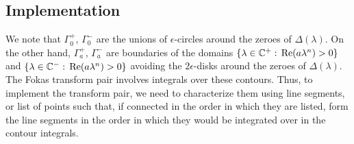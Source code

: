 \documentclass[11pt, oneside, a4paper]{article}
\begin{document}
\subsection{Implementation}
We note that $\Gamma_0^+$, $\Gamma_0^-$ are the unions of $\epsilon$-circles around the zeroes of $\Delta(\lambda)$. On the other hand, $\Gamma_a^+$, $\Gamma_a^-$ are boundaries of the domains $\{\lambda\in \mathbb C^+:\,\mathrm{Re}(a\lambda^n)>0\}$ and $\{\lambda\in \mathbb C^-:\,\mathrm{Re}(a\lambda^n)>0\}$ avoiding the $2\epsilon$-disks around the zeroes of $\Delta(\lambda)$. The Fokas transform pair involves integrals over these contours. Thus, to implement the transform pair, we need to characterize them using line segments, or list of points such that, if connected in the order in which they are listed, form the line segments in the order in which they would be integrated over in the contour integrals.
\end{document}
